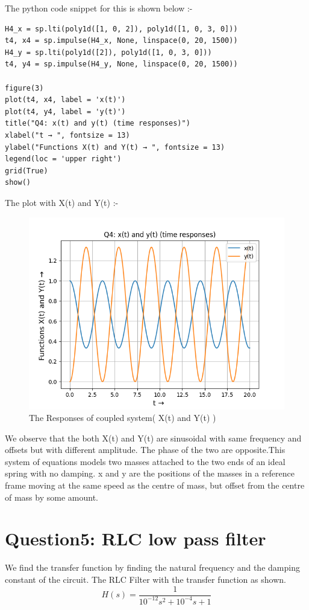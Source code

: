 \documentclass[11pt, a4paper]{article}
\begin{document}
The python code snippet for this is shown below :-
\begin{verbatim}
H4_x = sp.lti(poly1d([1, 0, 2]), poly1d([1, 0, 3, 0]))
t4, x4 = sp.impulse(H4_x, None, linspace(0, 20, 1500))
H4_y = sp.lti(poly1d([2]), poly1d([1, 0, 3, 0]))
t4, y4 = sp.impulse(H4_y, None, linspace(0, 20, 1500))  

figure(3)
plot(t4, x4, label = 'x(t)') 
plot(t4, y4, label = 'y(t)')
title("Q4: x(t) and y(t) (time responses)")
xlabel("t → ", fontsize = 13)
ylabel("Functions X(t) and Y(t) → ", fontsize = 13)
legend(loc = 'upper right')
grid(True)
show()
\end{verbatim}
The plot with X(t) and Y(t) :-
\cleardoublepage

\begin{figure}[!tbh]
 \centering
 \includegraphics[scale=0.6]{Ass6_Figure_3.png}  
 \caption{The Responses of coupled system( X(t) and Y(t) )}
\end{figure}
We observe that the both X(t) and Y(t) are sinusoidal with same frequency and offsets but with different amplitude. The phase of the two are opposite.This system of equations models two masses attached to the two ends of an ideal spring with no damping. x and y are the positions of the masses in a reference frame moving at the same speed as the centre of mass, but offset from the centre of mass by some amount.

\section{Question5: RLC low pass filter}
We find the transfer function by finding the natural frequency and the damping constant of the circuit.
The RLC Filter with the transfer function as shown.
\[ H(s) = \frac{1}{10^{-12}s^2 + 10^{-4}s + 1}\]
\end{document}
